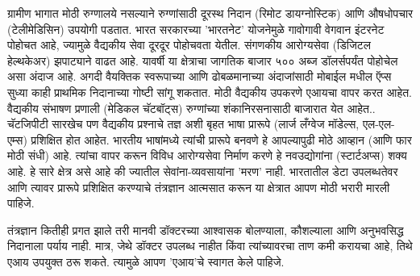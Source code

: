 ग्रामीण भागात मोठी रुग्णालये नसल्याने रुग्णांसाठी दूरस्थ निदान (रिमोट डायग्नोस्टिक) आणि औषधोपचार (टेलीमेडिसिन) उपयोगी पडतात. भारत सरकारच्या 'भारतनेट' योजनेमुळे गावोगावी वेगवान इंटरनेट पोहोचत आहे, ज्यामुळे वैद्यकीय सेवा दूरदूर पोहोचवता येतील. संगणकीय आरोग्यसेवा (डिजिटल हेल्थकेअर) झपाट्याने वाढत आहे. यावर्षी या क्षेत्राचा जागतिक बाजार ५०० अब्ज डॉलर्सपर्यंत पोहोचेल असा अंदाज आहे. अगदी वैयक्तिक स्वरूपाच्या आणि ढोबळमानाच्या अंदाजांसाठी मोबाईल मधील ऍप्स सुध्या काही प्राथमिक निदानाच्या गोष्टी सांगू शकतात. मोठी वैद्यकीय उपकरणे एआयचा वापर करत आहेत. वैद्यकीय संभाषण प्रणाली (मेडिकल चॅटबॉट्स) रुग्णांच्या शंकानिरसनासाठी बाजारात येत आहेत.. चॅटजिपीटी सारखेच पण वैद्यकीय प्रश्नाचे तज्ञ अशी बृहत भाषा प्रारूपे (लार्ज लँग्वेज मॉडेल्स, एल-एल-एम्स) प्रशिक्षित होत आहेत. भारतीय भाषांमध्ये त्यांची प्रारूपे बनवणे हे आपल्यापुढी मोठे आव्हान (आणि फार मोठी संधी) आहे. त्यांचा वापर करून विविध आरोग्यसेवा निर्माण करणे हे नवउद्योगांना (स्टार्टअप्स) शक्य आहे. हे सारे क्षेत्र असे आहे की ज्यातील सेवांना-व्यवसायांना 'मरण' नाही. भारतातील डेटा उपलब्धतेवर आणि त्यावर प्रारूपे प्रशिक्षित करण्याचे तंत्रज्ञान आत्मसात करून या क्षेत्रात आपण मोठी भरारी मारली पाहिजे.

तंत्रज्ञान कितीही प्रगत झाले तरी मानवी डॉक्टरच्या आश्वासक बोलण्याला, कौशल्याला आणि अनुभवसिद्ध निदानाला पर्याय नाही. मात्र, जेथे डॉक्टर उपलब्ध नाहीत किंवा त्यांच्यावरचा ताण कमी करायचा आहे, तिथे एआय उपयुक्त ठरू शकते. त्यामुळे आपण 'एआय'चे स्वागत केले पाहिजे.